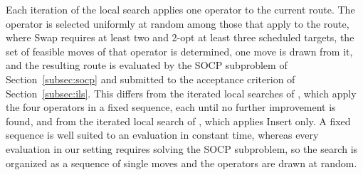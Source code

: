 \documentclass[11pt]{article}
\begin{document}
Each iteration of the local search applies one operator to the current route. The operator is selected uniformly at random among those that apply to the route, where Swap requires at least two and 2-opt at least three scheduled targets, the set of feasible moves of that operator is determined, one move is drawn from it, and the resulting route is evaluated by the SOCP subproblem of Section~\ref{subsec:socp} and submitted to the acceptance criterion of Section~\ref{subsec:ils}. This differs from the iterated local searches of \citep{gunawan2015iterated, gunawan2017well}, which apply the four operators in a fixed sequence, each until no further improvement is found, and from the iterated local search of \citep{vansteenwegen2009iterated}, which applies Insert only. A fixed sequence is well suited to an evaluation in constant time, whereas every evaluation in our setting requires solving the SOCP subproblem, so the search is organized as a sequence of single moves and the operators are drawn at random.
\end{document}
